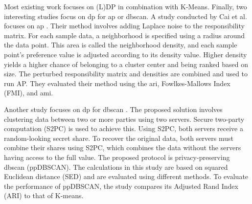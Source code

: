 Most existing work focuses on (L)DP in combination with K-Means.
Finally, two interesting studies focus on \gls{dp} for \gls{ap} or \gls{dbscan}.
A study conducted by Cai et al. focuses on \gls{ap} \citep{cai_dp-ap_2020}.
Their method involves adding Laplace noise to the responsibility matrix.
For each sample data, a neighborhood is specified using a radius around the data point.
This area is called the neighborhood density, and each sample point’s preference value is adjusted according to its density value.
Higher density yields a higher chance of belonging to a cluster center and being ranked based on size.
The perturbed responsibility matrix and densities are combined and used to run AP.
They evaluated their method using the  \gls{ari}, Fowlkes-Mallows Index (FMI), and \gls{ami}.

Another study focuses on \gls{dp} for \gls{dbscan} \citep{bozdemir_privacy-preserving_nodate}.
The proposed solution involves clustering data between two or more parties using two servers.
Secure two-party computation (S2PC) is used to achieve this.
Using S2PC, both servers receive a random-looking secret share.
To recover the original data, both servers must combine their shares using S2PC, which combines the data without the servers having access to the full value.
The proposed protocol is privacy-preserving \gls{dbscan} (ppDBSCAN).
The calculations in this study are based on squared Euclidean distance (SED) and are evaluated using different methods.
To evaluate the performance of ppDBSCAN, the study compares its Adjusted Rand Index (ARI) to that of K-means.
